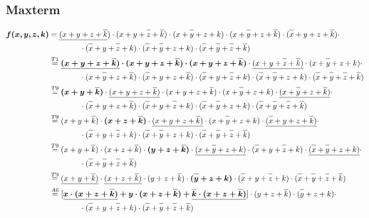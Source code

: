 \documentclass{article}
\newcommand*{\oline}[1]{\overline{#1\mathstrut}}
\newcommand{\bigspace}{\quad\quad\quad\quad}
\begin{document}
\subsubsection*{Maxterm}
\begin{align*}
  \bm{f(x,y,z,k)} &= \underline{(x+y+z+\oline{k}}) \cdot (x+y+\oline{z}+\oline{k}) \cdot (x+\oline{y}+z+k) \cdot (x+\oline{y}+z+\oline{k}) \cdot (\oline{x}+y+z+\oline{k}) \cdot \\
  &\bigspace \cdot (\oline{x}+y+\oline{z}+k) \cdot (\oline{x}+\oline{y}+z+k) \cdot (\oline{x}+\oline{y}+\oline{z}+\oline{k})\\
  &\overset{T1}{=} \bm{\underline{(x+y+z+\oline{k})} \cdot (x+y+z+\oline{k}) \cdot (x+y+z+\oline{k})} \cdot \underline{(x+y+\oline{z}+\oline{k})} \cdot (x+\oline{y}+z+k) \cdot \\
  &\bigspace \cdot (x+\oline{y}+z+\oline{k}) \cdot (\oline{x}+y+z+\oline{k}) \cdot (\oline{x}+y+\oline{z}+k) \cdot (\oline{x}+\oline{y}+z+k) \cdot (\oline{x}+\oline{y}+\oline{z}+\oline{k})\\
  &\overset{T9}{=} \bm{(x+y+\oline{k})} \cdot \underline{(x+y+z+\oline{k})} \cdot (x+y+z+\oline{k}) \cdot (x+\oline{y}+z+k) \cdot \underline{(x+\oline{y}+z+\oline{k})} \cdot \\
  &\bigspace \cdot (\oline{x}+y+z+\oline{k}) \cdot (\oline{x}+y+\oline{z}+k) \cdot (\oline{x}+\oline{y}+z+k) \cdot (\oline{x}+\oline{y}+\oline{z}+\oline{k})\\
  &\overset{T9}{=} (x+y+\oline{k}) \cdot \bm{(x+z+\oline{k})} \cdot \underline{(x+y+z+\oline{k})} \cdot (x+\oline{y}+z+k) \cdot \underline{(\oline{x}+y+z+\oline{k})} \cdot\\
  &\bigspace \cdot (\oline{x}+y+\oline{z}+k) \cdot (\oline{x}+\oline{y}+z+k) \cdot (\oline{x}+\oline{y}+\oline{z}+\oline{k})\\
  &\overset{T9}{=} (x+y+\oline{k}) \cdot (x+z+\oline{k}) \cdot \bm{(y+z+\oline{k})} \cdot \underline{(x+\oline{y}+z+k)} \cdot (\oline{x}+y+\oline{z}+k) \cdot \underline{(\oline{x}+\oline{y}+z+k)} \cdot\\
  &\bigspace \cdot (\oline{x}+\oline{y}+\oline{z}+\oline{k})\\
  &\overset{T9}{=} \underline{(x+y+\oline{k})} \cdot \underline{(x+z+\oline{k})} \cdot (y+z+\oline{k}) \cdot \bm{(\oline{y}+z+k)} \cdot (\oline{x}+y+\oline{z}+k) \cdot (\oline{x}+\oline{y}+\oline{z}+\oline{k})\\
  &\overset{A6}{=} [\bm{\underline{x \cdot (x+z+\oline{k})} + y \cdot (x+z+\oline{k}) + \underline{\oline{k} \cdot (x+z+\oline{k})}}] \cdot (y+z+\oline{k}) \cdot (\oline{y}+z+k) \cdot\\
  &\bigspace \cdot (\oline{x}+y+\oline{z}+k) \cdot (\oline{x}+\oline{y}+\oline{z}+\oline{k})
\end{align*}
\end{document}
